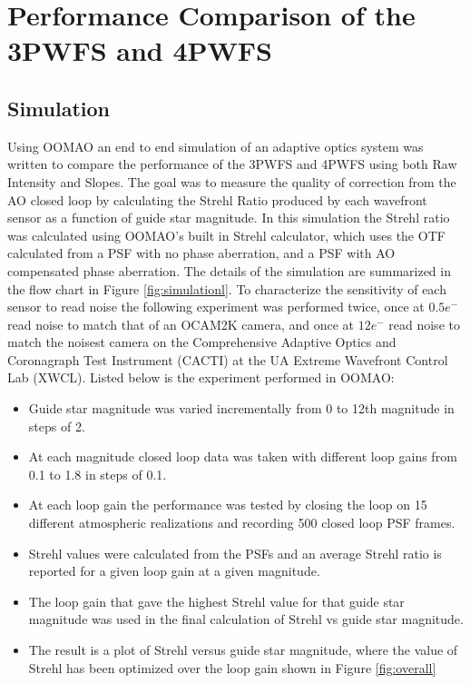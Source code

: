 \section{Performance Comparison of the 3PWFS and 4PWFS}
\subsection{Simulation}

Using OOMAO an end to end simulation of an adaptive optics system was written to compare the performance of the 3PWFS and 4PWFS using both Raw Intensity and Slopes.  The goal was to measure the quality of correction from the AO closed loop by calculating the Strehl Ratio produced by each wavefront sensor as a function of guide star magnitude. In this simulation the Strehl ratio was calculated using OOMAO's built in Strehl calculator, which uses the OTF calculated from a PSF with no phase aberration, and a PSF with AO compensated phase aberration. The details of the simulation are summarized in the flow chart in Figure \ref{fig:simulationl}. To characterize the sensitivity of each sensor to read noise the following experiment was performed twice, once at $0.5e^-$ read noise to match that of an OCAM2K camera, and once at $12 e^-$ read noise to match the noisest camera on the Comprehensive Adaptive Optics and Coronagraph Test Instrument (CACTI) at the UA Extreme Wavefront Control Lab (XWCL). Listed below is the experiment performed in OOMAO:

\begin{itemize}
    \item Guide star magnitude was varied incrementally from 0 to 12th magnitude in steps of 2.
    \item At each magnitude closed loop data was taken with different loop gains from 0.1 to 1.8 in steps of 0.1.
    \item At each loop gain the performance was tested by closing the loop on 15 different atmospheric realizations and recording 500 closed loop PSF frames. 
    \item Strehl values were calculated from the PSFs and an average Strehl ratio is reported for a given loop gain at a given magnitude.
    \item The loop gain that gave the highest Strehl value for that guide star magnitude was used in the final calculation of Strehl vs guide star magnitude.
    \item The result is a plot of Strehl versus guide star magnitude, where the value of Strehl has been optimized over the loop gain shown in Figure \ref{fig:overall}
\end{itemize}


